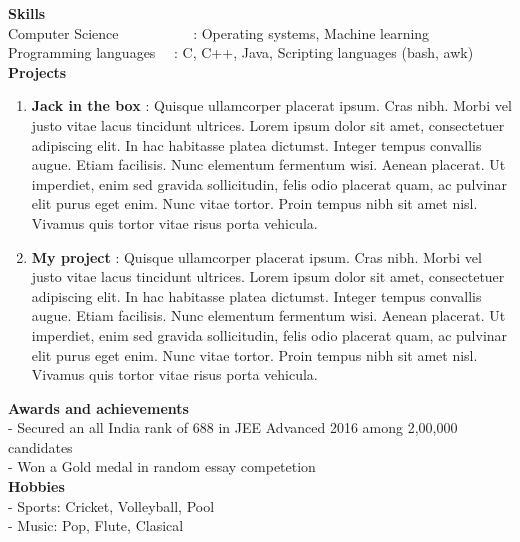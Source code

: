\documentclass{article}
\newcommand\fs[1][1cm]{\hspace*{#1}}
\begin{document}
\vspace{0.4cm}
\noindent\fs[0.2 cm]\textbf{Skills}
\vspace{0.2cm} \\
\fs[0.2 cm]Computer Science \ \ \ \ \ \ \ \ \ \ : Operating systems, Machine learning \\
\fs[0.2 cm]Programming languages \ \  : C, C++, Java, Scripting languages (bash, awk)
\vspace{0.3cm} \\

\noindent\fs[0.2 cm]\textbf{Projects}

\begin{enumerate}
    \item \textbf{Jack in the box} : Quisque ullamcorper placerat ipsum. Cras nibh. Morbi vel justo vitae lacus tincidunt
ultrices. Lorem ipsum dolor sit amet, consectetuer adipiscing elit. In hac habitasse platea dictumst.
Integer tempus convallis augue. Etiam facilisis. Nunc elementum fermentum wisi. Aenean placerat. Ut
imperdiet, enim sed gravida sollicitudin, felis odio placerat quam, ac pulvinar elit purus eget enim. Nunc
vitae tortor. Proin tempus nibh sit amet nisl. Vivamus quis tortor vitae risus porta vehicula.
    \item \textbf{My project }: Quisque ullamcorper placerat ipsum. Cras nibh. Morbi vel justo vitae lacus tincidunt
ultrices. Lorem ipsum dolor sit amet, consectetuer adipiscing elit. In hac habitasse platea dictumst.
Integer tempus convallis augue. Etiam facilisis. Nunc elementum fermentum wisi. Aenean placerat. Ut
imperdiet, enim sed gravida sollicitudin, felis odio placerat quam, ac pulvinar elit purus eget enim. Nunc
vitae tortor. Proin tempus nibh sit amet nisl. Vivamus quis tortor vitae risus porta vehicula.
\end{enumerate}
\vspace{0.4 cm}

\noindent\fs[0.1 cm]\textbf{Awards and achievements}
\vspace{0.2cm} \\
\fs[0.8 cm]-  Secured an all India rank of 688 in JEE Advanced 2016 among 2,00,000 candidates \\
\fs[0.8 cm]-  Won a Gold medal in random  essay competetion
\vspace{0.4 cm} \\

\noindent\fs[0.1 cm]\textbf{Hobbies}
\vspace{0.2cm} \\
\fs[0.8 cm]-   Sports: Cricket, Volleyball, Pool\\
\fs[0.8 cm]-   Music: Pop, Flute, Clasical \\
\vspace{0.4 cm} \\
\end{document}
